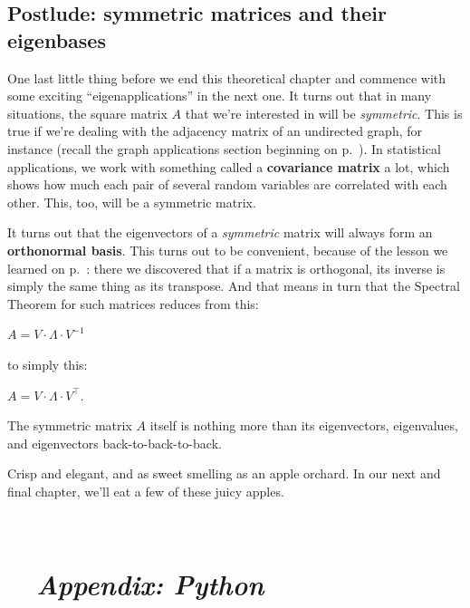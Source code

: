\subsection{Postlude: symmetric matrices and their eigenbases}


One last little thing before we end this theoretical chapter and commence with
some exciting ``eigenapplications'' in the next one. It turns out that in many
situations, the square matrix $A$ that we're interested in will be
\textit{symmetric}. This is true if we're dealing with the adjacency matrix of
an undirected graph, for instance (recall the graph applications section
beginning on p.~\pageref{sec:graphs}). In statistical applications, we work
with something called a \textbf{covariance matrix} a lot, which shows how much
each pair of several random variables are correlated with each other. This,
too, will be a symmetric matrix.


It turns out that the eigenvectors of a \textit{symmetric} matrix will always
form an \textbf{orthonormal basis}. This turns out to be convenient, because of
the lesson we learned on p.~\pageref{orthoInverseTranspose}: there we
discovered that if a matrix is orthogonal, its inverse is simply the same thing
as its transpose. And that means in turn that the Spectral Theorem for such
matrices reduces from this:

\begin{center}
$A = V\cdot \Lambda \cdot V^{-1}$
\end{center}

to simply this:

\begin{center}
$A = V\cdot \Lambda \cdot V^\intercal$.
\end{center}

The symmetric matrix $A$ itself is nothing more than its eigenvectors,
eigenvalues, and eigenvectors back-to-back-to-back.

Crisp and elegant, and as sweet smelling as an apple orchard. In our next and
final chapter, we'll eat a few of these juicy apples.

\vfill
\hrulefill \\

\pagebreak

\section*{\faPython \ \ \textit{Appendix: Python}}


